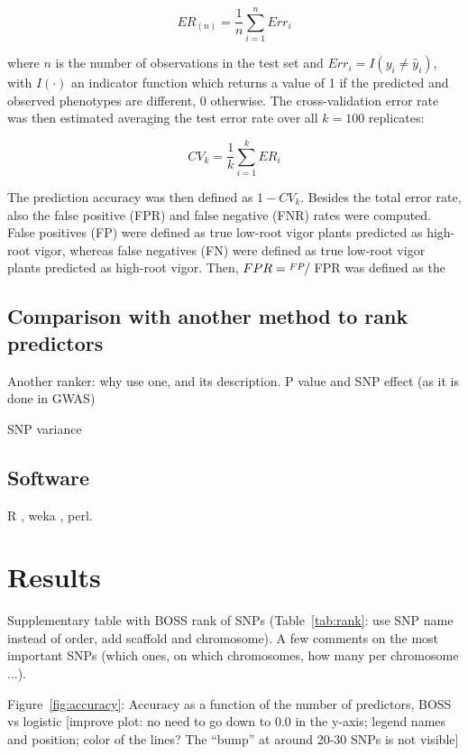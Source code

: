 \begin{equation} \label{eq:testerr}
 ER_{(n)}=\frac{1}{n} \sum_{i=1}^{n} Err_i
\end{equation}

where $n$ is the number of observations in the test set and $Err_i=I(y_i \neq \hat{y}_i)$, with $I(\cdot)$ an indicator function
which returns a value of 1 if the predicted and observed phenotypes are
different, 0 otherwise. 
The cross-validation error rate was then estimated averaging the test error
rate over all $k=100$ replicates:

\begin{equation} \label{eq:cverr}
CV_{k}=\frac{1}{k} \sum_{i=1}^k ER_i
\end{equation}

The prediction accuracy was then defined as $1-CV_k$. Besides the total
error rate, also the false positive (FPR) and false negative (FNR) rates
were computed. False positives (FP) were defined as true low-root vigor
plants predicted as high-root vigor, whereas false negatives (FN) were
defined as true low-root vigor plants predicted as high-root vigor.
Then, $FPR=\sfrac{FP}{}$ FPR was defined as the 

\subsection{Comparison with another method to rank predictors}
\label{sec:other_ranker}
Another ranker: why use one, and its description.
P value and SNP effect (as it is done in GWAS)

SNP variance \cite{gianola2009additive}

\subsection{Software}
\label{sec:software}
R \cite{r2008manual}, weka \cite{hall2009weka}, perl.

\section{Results}
\label{sec:results}
Supplementary table with BOSS rank of SNPs (Table~\ref{tab:rank}: use
SNP name instead of order, add scaffold and chromosome). A few comments on the most
important SNPs (which ones, on which chromosomes, how many per
chromosome ...).

Figure~\ref{fig:accuracy}: Accuracy as a function of the number of
predictors, BOSS vs logistic [improve plot: no need to go down to 0.0 in
the y-axis; legend names and position; color of the lines? The ``bump''
at around 20-30 SNPs is not visible]

